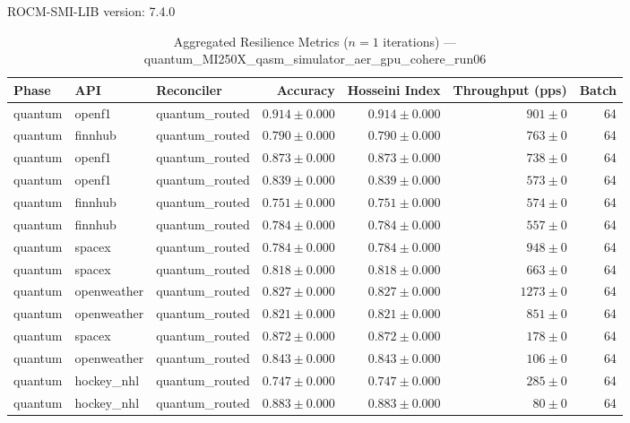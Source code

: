 ROCM-SMI-LIB version: 7.4.0

\begin{table}[htbp]
\caption{Aggregated Resilience Metrics ($n=1$ iterations) --- quantum_MI250X_qasm_simulator_aer_gpu_cohere_run06}
\begin{tabular}{l l l r r r r}
\hline
Phase & API & Reconciler & Accuracy & Hosseini Index & Throughput (pps) & Batch \\
\hline
quantum & openf1 & quantum\_routed & $0.914\pm0.000$ & $0.914\pm0.000$ & $901\pm0$ & 64 \\
quantum & finnhub & quantum\_routed & $0.790\pm0.000$ & $0.790\pm0.000$ & $763\pm0$ & 64 \\
quantum & openf1 & quantum\_routed & $0.873\pm0.000$ & $0.873\pm0.000$ & $738\pm0$ & 64 \\
quantum & openf1 & quantum\_routed & $0.839\pm0.000$ & $0.839\pm0.000$ & $573\pm0$ & 64 \\
quantum & finnhub & quantum\_routed & $0.751\pm0.000$ & $0.751\pm0.000$ & $574\pm0$ & 64 \\
quantum & finnhub & quantum\_routed & $0.784\pm0.000$ & $0.784\pm0.000$ & $557\pm0$ & 64 \\
quantum & spacex & quantum\_routed & $0.784\pm0.000$ & $0.784\pm0.000$ & $948\pm0$ & 64 \\
quantum & spacex & quantum\_routed & $0.818\pm0.000$ & $0.818\pm0.000$ & $663\pm0$ & 64 \\
quantum & openweather & quantum\_routed & $0.827\pm0.000$ & $0.827\pm0.000$ & $1273\pm0$ & 64 \\
quantum & openweather & quantum\_routed & $0.821\pm0.000$ & $0.821\pm0.000$ & $851\pm0$ & 64 \\
quantum & spacex & quantum\_routed & $0.872\pm0.000$ & $0.872\pm0.000$ & $178\pm0$ & 64 \\
quantum & openweather & quantum\_routed & $0.843\pm0.000$ & $0.843\pm0.000$ & $106\pm0$ & 64 \\
quantum & hockey\_nhl & quantum\_routed & $0.747\pm0.000$ & $0.747\pm0.000$ & $285\pm0$ & 64 \\
quantum & hockey\_nhl & quantum\_routed & $0.883\pm0.000$ & $0.883\pm0.000$ & $80\pm0$ & 64 \\

\end{tabular}
\end{table}
